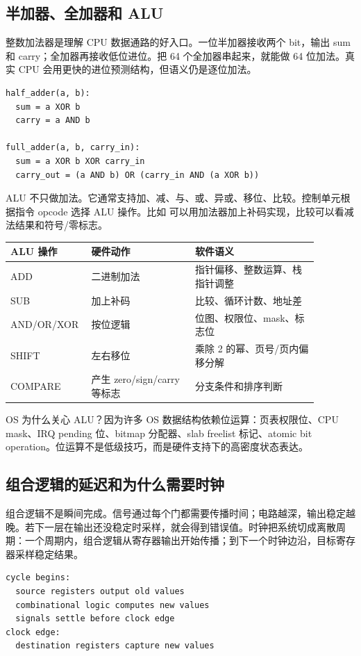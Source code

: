 \subsection{半加器、全加器和 ALU}

整数加法器是理解 CPU 数据通路的好入口。一位半加器接收两个 bit，输出 sum 和 carry；全加器再接收低位进位。把 64 个全加器串起来，就能做 64 位加法。真实 CPU 会用更快的进位预测结构，但语义仍是逐位加法。

\begin{lstlisting}
half_adder(a, b):
  sum = a XOR b
  carry = a AND b

full_adder(a, b, carry_in):
  sum = a XOR b XOR carry_in
  carry_out = (a AND b) OR (carry_in AND (a XOR b))
\end{lstlisting}

ALU 不只做加法。它通常支持加、减、与、或、异或、移位、比较。控制单元根据指令 opcode 选择 ALU 操作。比如  可以用加法器加上补码实现，比较可以看减法结果和符号/零标志。

\begin{longtable}{p{0.18\linewidth}p{0.32\linewidth}p{0.38\linewidth}}
\toprule
ALU 操作 & 硬件动作 & 软件语义 \\
\midrule
ADD & 二进制加法 & 指针偏移、整数运算、栈指针调整 \\
SUB & 加上补码 & 比较、循环计数、地址差 \\
AND/OR/XOR & 按位逻辑 & 位图、权限位、mask、标志位 \\
SHIFT & 左右移位 & 乘除 2 的幂、页号/页内偏移分解 \\
COMPARE & 产生 zero/sign/carry 等标志 & 分支条件和排序判断 \\
\bottomrule
\end{longtable}

OS 为什么关心 ALU？因为许多 OS 数据结构依赖位运算：页表权限位、CPU mask、IRQ pending 位、bitmap 分配器、slab freelist 标记、atomic bit operation。位运算不是低级技巧，而是硬件支持下的高密度状态表达。

\subsection{组合逻辑的延迟和为什么需要时钟}

组合逻辑不是瞬间完成。信号通过每个门都需要传播时间；电路越深，输出稳定越晚。若下一层在输出还没稳定时采样，就会得到错误值。时钟把系统切成离散周期：一个周期内，组合逻辑从寄存器输出开始传播；到下一个时钟边沿，目标寄存器采样稳定结果。

\begin{lstlisting}
cycle begins:
  source registers output old values
  combinational logic computes new values
  signals settle before clock edge
clock edge:
  destination registers capture new values
\end{lstlisting}

